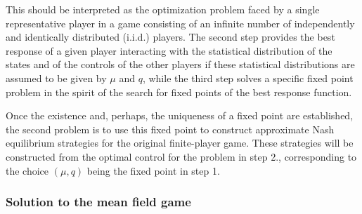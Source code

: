 \documentclass[11pt]{article}
\theoremstyle{definition}
\begin{document}
This should be interpreted as the optimization problem faced by a single representative player in a game consisting of an infinite number of independently and identically distributed (i.i.d.) players. The second step provides the best response of a given player interacting with the statistical distribution of the states and of the controls of the other players if these statistical distributions are assumed to be given by $\mu$ and $q$, while the third step solves a specific fixed point problem in the spirit of the search for fixed points of the best response function.

Once the existence and, perhaps, the uniqueness of a fixed point are established, the second problem is to use this fixed point to construct approximate Nash equilibrium strategies for the original finite-player game. These strategies will be constructed from the optimal control for the problem in step 2., corresponding to the choice $(\mu,q)$ being the fixed point in step 1.

\subsubsection*{Solution to the mean field game}
\end{document}
